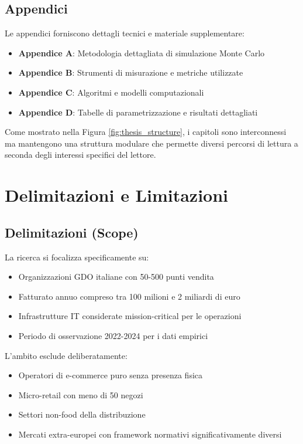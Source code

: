 \begin{bibunit}[IEEEtran]
\subsection{Appendici}

Le appendici forniscono dettagli tecnici e materiale supplementare:
\begin{itemize}
\item \textbf{Appendice A}: Metodologia dettagliata di simulazione Monte Carlo
\item \textbf{Appendice B}: Strumenti di misurazione e metriche utilizzate
\item \textbf{Appendice C}: Algoritmi e modelli computazionali
\item \textbf{Appendice D}: Tabelle di parametrizzazione e risultati dettagliati
\end{itemize}

Come mostrato nella Figura \ref{fig:thesis_structure}, i capitoli sono interconnessi ma mantengono una struttura modulare che permette diversi percorsi di lettura a seconda degli interessi specifici del lettore.

\section{Delimitazioni e Limitazioni}

\subsection{Delimitazioni (Scope)}

La ricerca si focalizza specificamente su:
\begin{itemize}
\item Organizzazioni GDO italiane con 50-500 punti vendita
\item Fatturato annuo compreso tra 100 milioni e 2 miliardi di euro
\item Infrastrutture IT considerate mission-critical per le operazioni
\item Periodo di osservazione 2022-2024 per i dati empirici
\end{itemize}

L'ambito esclude deliberatamente:
\begin{itemize}
\item Operatori di e-commerce puro senza presenza fisica
\item Micro-retail con meno di 50 negozi
\item Settori non-food della distribuzione
\item Mercati extra-europei con framework normativi significativamente diversi
\end{itemize}


\end{bibunit}
